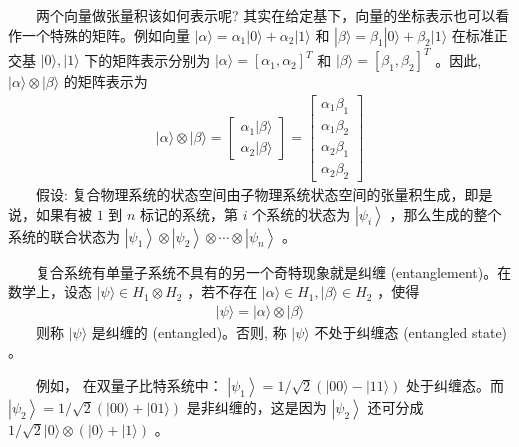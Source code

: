 \documentclass[a4paper,11pt,english]{sphinxmanual}
\begin{document}
\sphinxAtStartPar
  两个向量做张量积该如何表示呢? 其实在给定基下，向量的坐标表示也可以看作一个特殊的矩阵。例如向量  \(|\alpha\rangle=\alpha_{1}|0\rangle+\alpha_{2}|1\rangle\) 和  \(|\beta\rangle=\beta_{1}|0\rangle+\beta_{2}|1\rangle\) 在标准正交基  \({|0\rangle,|1\rangle}\) 下的矩阵表示分别为  \(|\alpha\rangle=\left[\alpha_{1}, \alpha_{2}\right]^{T}\) 和  \(|\beta\rangle=\left[\beta_{1}, \beta_{2}\right]^{T}\) 。因此, \(|\alpha\rangle \otimes|\beta\rangle\) 的矩阵表示为
\begin{equation*}
\begin{split}|\alpha\rangle \otimes|\beta\rangle=\left[\begin{array}{c} \alpha_{1}|\beta\rangle \\ \alpha_{2}|\beta\rangle \end{array}\right]=\left[\begin{array}{c} \alpha_{1} \beta_{1} \\ \alpha_{1} \beta_{2} \\ \alpha_{2} \beta_{1} \\ \alpha_{2} \beta_{2} \end{array}\right]\end{split}
\end{equation*}
\sphinxAtStartPar
  假设: 复合物理系统的状态空间由子物理系统状态空间的张量积生成，即是说，如果有被 \(1\) 到 \(n\) 标记的系统，第  \({i}\) 个系统的状态为  \(\left|\psi_{i}\right\rangle\) ，那么生成的整个系统的联合状态为  \(\left|\psi_{1}\right\rangle \otimes\left|\psi_{2}\right\rangle \otimes \cdots \otimes\left|\psi_{n}\right\rangle\) 。

\sphinxAtStartPar
  复合系统有单量子系统不具有的另一个奇特现象就是纠缠 (entanglement)。在数学上，设态  \(|\psi\rangle \in H_{1} \otimes H_{2}\) ，若不存在  \(|\alpha\rangle \in H_{1},|\beta\rangle \in H_{2}\) ，使得
\begin{equation*}
\begin{split}|\psi\rangle=|\alpha\rangle \otimes|\beta\rangle\end{split}
\end{equation*}
\sphinxAtStartPar
  则称  \(|\psi\rangle\) 是纠缠的 (entangled)。否则, 称  \(|\psi\rangle\) 不处于纠缠态 (entangled state) 。

\sphinxAtStartPar
  例如， 在双量子比特系统中：  \(\left|\psi_{1}\right\rangle=1 / \sqrt{2}(|00\rangle-|11\rangle)\) 处于纠缠态。而  \(\left|\psi_{2}\right\rangle=1 / \sqrt{2}(|00\rangle+|01\rangle)\) 是非纠缠的，这是因为  \(\left|\psi_{2}\right\rangle\) 还可分成  \(1 / \sqrt{2}|0\rangle \otimes(|0\rangle+|1\rangle)\) 。
\end{document}
